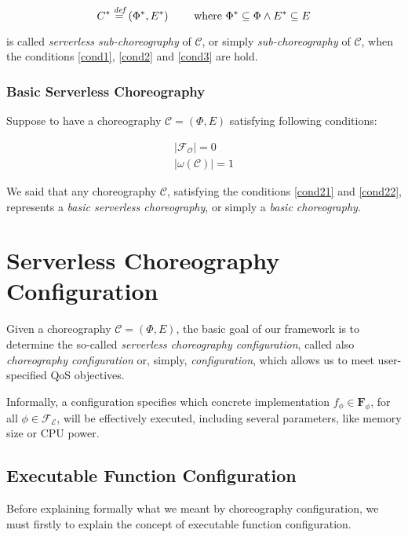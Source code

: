 \begin{equation}
	C^* \overset{\textit{def}}{=} (\Phi^*,E^*) \qquad \text{ where } \Phi^* \subseteq \Phi \wedge E^* \subseteq E
\end{equation}

is called \textit{serverless sub-choreography} of $\mathcal{C}$, or simply \textit{sub-choreography} of $\mathcal{C}$, when the conditions \ref{cond1}, \ref{cond2} and \ref{cond3} are hold.

\subsubsection{Basic Serverless Choreography}\label{BasicDefinition}

Suppose to have a choreography $\mathcal{C} = (\Phi,E)$ satisfying following conditions:

\begin{eqnarray}
	|\mathscr{F_O}| = 0 \label{cond21} \\
	|\omega(\mathcal{C})| = 1 \label{cond22}
\end{eqnarray}

We said that any choreography $\mathcal{C}$, satisfying the conditions \ref{cond21} and \ref{cond22}, represents a \textit{basic serverless choreography}, or simply a \textit{basic choreography}.

\newpage
\section{Serverless Choreography Configuration}

Given a choreography $\mathcal{C} = (\Phi,E)$, the basic goal of our framework is to determine the so-called \textit{serverless choreography configuration}, called also \textit{choreography configuration} or, simply, \textit{configuration}, which allows us to meet user-specified QoS objectives.

Informally, a configuration specifies which concrete implementation $f_{\phi} \in \textbf{F}_{\phi}$, for all $\phi \in \mathscr{F_E}$, will be effectively executed, including several parameters, like memory size or CPU power.

\subsection{Executable Function Configuration}

Before explaining formally what we meant by choreography configuration, we must firstly to explain the concept of executable function configuration.

